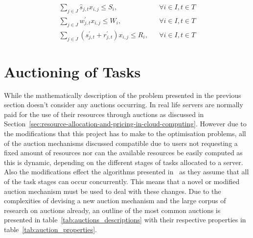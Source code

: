 \begin{align}
    \sum_{j \in J} \hat{s}_{j,t} x_{i,j} \leq S_i, && \forall{i \in I, t \in T} \label{eq:server_storage_capacity} \\
    \sum_{j \in J} w^{'}_{j,t} x_{i,j} \leq W_i, && \forall{i \in I, t \in T} \label{eq:server_computation_capacity} \\
    \sum_{j \in J} (s^{'}_{j,t} + r^{'}_{j,t}) x_{i,j} \leq R_i, && \forall{i \in I, t \in T} \label{eq:server_bandwidth_capacity}
\end{align}

\section{Auctioning of Tasks}\label{sec:auctioning-of-tasks}
While the mathematically description of the problem presented in the previous section doesn't consider any auctions
occurring. In real life servers are normally paid for the use of their resources through auctions as discussed in
Section~\ref{sec:resource-allocation-and-pricing-in-cloud-computing}. However due to the modifications
that this project has to make to the optimisation problems, all of the auction mechanisms discussed compatible due to
users not requesting a fixed amount of resources nor can the available resources be easily computed as this is dynamic,
depending on the different stages of tasks allocated to a server. Also the modifications effect the algorithms presented
in~\cite{FlexibleResourceAllocation} as they assume that all of the task stages can occur concurrently. This means that
a novel or modified auction mechanism must be used to deal with these changes. Due to the complexities of devising a new
auction mechanism and the large corpus of research on auctions already, an outline of the most common auctions is
presented in table~\ref{tab:auctions_descriptions} with their respective properties in table~\ref{tab:auction_properties}.

